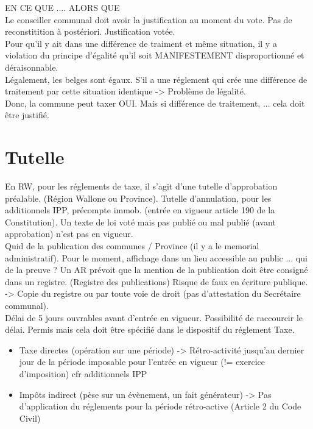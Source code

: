\documentclass{book}
\begin{document}
EN CE QUE .... ALORS QUE\\

Le conseiller communal doit avoir la justification au moment du vote. Pas de reconstitition à postériori. Justification votée.  \\

Pour qu'il y ait dans une différence de traiment et même situation, il y a violation du principe d'égalité qu'il soit MANIFESTEMENT disproportionné et déraisonnable.\\

Légalement, les belges sont égaux. S'il a une réglement qui crée une différence de traitement par cette situation identique -> Problème de légalité.\\

Donc, la commune peut taxer OUI. Mais si différence de traitement, ... cela doit être justifié.\\

\section{Tutelle}

 En RW, pour les réglements de taxe, il s'agit d'une tutelle d'approbation préalable. (Région Wallone ou Province). Tutelle d'annulation, pour les additionnels IPP, précompte immob. (entrée en vigueur article 190 de la Constitution). Un texte de loi voté mais pas publié ou mal publié (avant approbation) n'est pas en vigueur.\\

Quid de la publication des communes / Province (il y a le memorial administratif). Pour le moment, affichage dans un lieu accessible au public ... qui de la preuve ? Un AR prévoit que la mention de la publication doit être consigné dans un registre. (Registre des publications) Risque de faux en écriture publique. -> Copie du registre ou par toute voie de droit (pas d'attestation du Secrétaire communal).\\

Délai de 5 jours ouvrables avant d'entrée en vigueur. Possibilité de raccourcir le délai. Permis mais cela doit être spécifié dans le dispositif du réglement Taxe. \\

\begin{itemize}
\item Taxe directes (opération sur une période) -> Rétro-activité jusqu'au dernier jour de la période imposable pour l'entrée en vigueur (!= exercice d'imposition) cfr additionnels IPP
\item Impôts indirect (pèse sur un évènement, un fait générateur) -> Pas d'application du réglements pour la période rétro-active (Article 2 du Code Civil)
\end{itemize}
\end{document}
